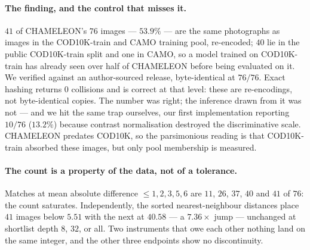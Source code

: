 \documentclass{article} %
\begin{document}
\paragraph{The finding, and the control that misses it.} $41$ of CHAMELEON's $76$ images
--- $53.9\%$ --- are the same photographs as images in the COD10K-train and CAMO training pool,
re-encoded; $40$ lie in the public COD10K-train split and one in CAMO, so a model trained on
COD10K-train has already seen over half of CHAMELEON before being evaluated on it. We verified against
an author-sourced release, byte-identical at $76/76$. Exact hashing returns $0$ collisions and is
correct at that level: these are re-encodings, not byte-identical copies. The number was right; the
inference drawn from it was not --- and we hit the same trap ourselves, our first implementation
reporting $10/76$ ($13.2\%$) because contrast normalisation destroyed the discriminative scale.
CHAMELEON predates COD10K, so the parsimonious reading is that COD10K-train absorbed these images, but
only pool membership is measured.

\paragraph{The count is a property of the data, not of a tolerance.} Matches at mean absolute
difference $\leq 1,2,3,5,6$ are $11$, $26$, $37$, $40$ and $41$ of $76$: the count saturates.
Independently, the sorted nearest-neighbour distances place $41$ images below $5.51$ with the next at
$40.58$ --- a $7.36\times$ jump --- unchanged at shortlist depth $8$, $32$, or all. Two instruments
that owe each other nothing land on the same integer, and the other three endpoints show no
discontinuity.
\end{document}

